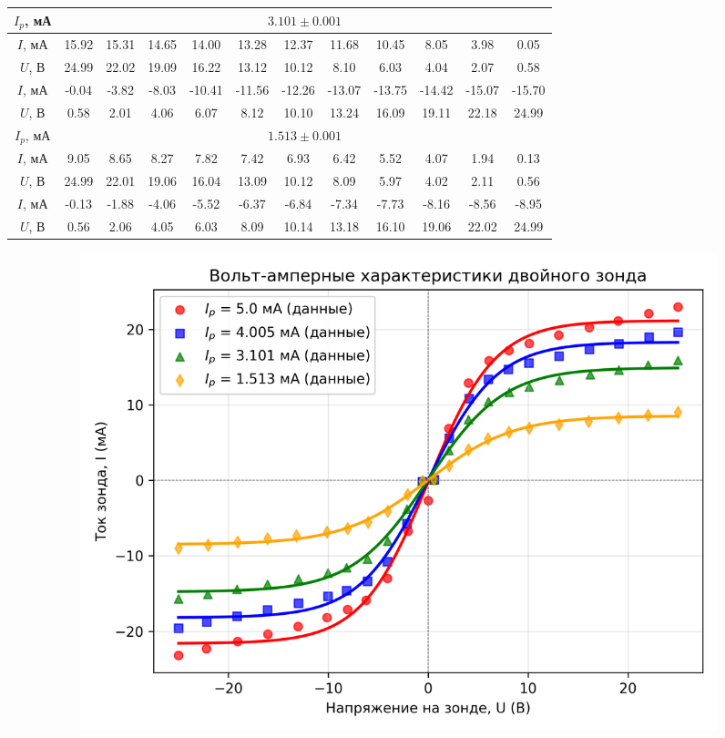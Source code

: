 \documentclass[a4paper, 12pt]{article}
\begin{document}
\begin{enumerate}
\begin{center}
\begin{tabular}{|c|c|c|c|c|c|c|c|c|c|c|c|}
            \hline
            $I_{p}$, мА & \multicolumn{11}{|c|}{$3.101\pm 0.001$}\\
            \hline
            $I$, мА & 15.92 & 15.31 & 14.65 & 14.00 & 13.28 & 12.37 & 11.68 & 10.45 & 8.05 & 3.98 & 0.05\\
            $U$, В & 24.99 & 22.02 & 19.09 & 16.22 & 13.12 & 10.12 & 8.10 & 6.03 & 4.04 & 2.07 & 0.58\\
            \hline
            $I$, мА & -0.04 & -3.82 & -8.03 & -10.41 & -11.56 & -12.26 & -13.07 & -13.75 & -14.42 & -15.07 & -15.70\\
            $U$, В & 0.58 & 2.01 & 4.06 & 6.07 & 8.12 & 10.10 & 13.24 & 16.09 & 19.11 & 22.18 & 24.99\\
            \hline
            $I_{p}$, мА & \multicolumn{11}{|c|}{$1.513\pm 0.001$}\\
            \hline
            $I$, мА & 9.05 & 8.65 & 8.27 & 7.82 & 7.42 & 6.93 & 6.42 & 5.52 & 4.07 & 1.94 & 0.13\\
            $U$, В & 24.99 & 22.01 & 19.06 & 16.04 & 13.09 & 10.12 & 8.09 & 5.97 & 4.02 & 2.11 & 0.56\\
            \hline
            $I$, мА & -0.13 & -1.88 & -4.06 & -5.52 & -6.37 & -6.84 & -7.34 & -7.73 & -8.16 & -8.56 & -8.95\\
            $U$, В & 0.56 & 2.06 & 4.05 & 6.03 & 8.09 & 10.14 & 13.18 & 16.10 & 19.06 & 22.02 & 24.99\\
            \hline
        \end{tabular}
    \end{center}
    \begin{figure}[htbp]
        \centering
        \begin{subfigure}{0.45\textwidth}
                \includegraphics[width=\linewidth]{zond.png}

\end{subfigure}
\end{figure}
\end{enumerate}
\end{document}

